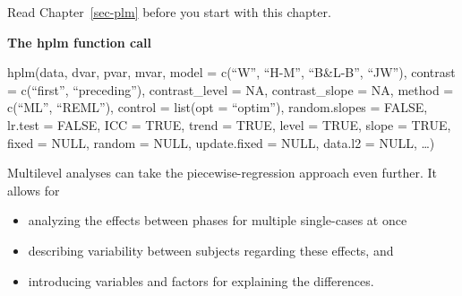 \documentclass[
  letterpaper,
  DIV=11,
  numbers=noendperiod]{scrreprt}
\providecommand{\tightlist}{%
  \setlength{\itemsep}{0pt}\setlength{\parskip}{0pt}}\usepackage{longtable,booktabs,array}
\begin{document}
\begin{tcolorbox}[enhanced jigsaw, breakable, toptitle=1mm, colframe=quarto-callout-note-color-frame, arc=.35mm, titlerule=0mm, coltitle=black, rightrule=.15mm, bottomtitle=1mm, bottomrule=.15mm, colbacktitle=quarto-callout-note-color!10!white, title=\textcolor{quarto-callout-note-color}{\faInfo}\hspace{0.5em}{Note}, colback=white, opacitybacktitle=0.6, opacityback=0, leftrule=.75mm, toprule=.15mm, left=2mm]

Read Chapter~\ref{sec-plm} before you start with this chapter.

\end{tcolorbox}

\begin{tcolorbox}[enhanced jigsaw, breakable, rightrule=.15mm, bottomrule=.15mm, arc=.35mm, colback=white, colframe=quarto-callout-tip-color-frame, opacityback=0, leftrule=.75mm, toprule=.15mm, left=2mm]
\begin{minipage}[t]{5.5mm}
\textcolor{quarto-callout-tip-color}{\faLightbulb}
\end{minipage}%
\begin{minipage}[t]{\textwidth - 5.5mm}

\textbf{The hplm function call}\vspace{2mm}

hplm(data, dvar, pvar, mvar, model = c(``W'', ``H-M'', ``B\&L-B'',
``JW''), contrast = c(``first'', ``preceding''), contrast\_level = NA,
contrast\_slope = NA, method = c(``ML'', ``REML''), control = list(opt =
``optim''), random.slopes = FALSE, lr.test = FALSE, ICC = TRUE, trend =
TRUE, level = TRUE, slope = TRUE, fixed = NULL, random = NULL,
update.fixed = NULL, data.l2 = NULL, \ldots)

\end{minipage}%
\end{tcolorbox}

Multilevel analyses can take the piecewise-regression approach even
further. It allows for

\begin{itemize}
\tightlist
\item
  analyzing the effects between phases for multiple single-cases at once
\item
  describing variability between subjects regarding these effects, and
\item
  introducing variables and factors for explaining the differences.
\end{itemize}
\end{document}
